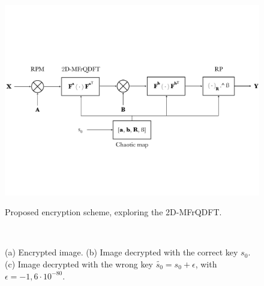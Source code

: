 \begin{figure}
\centering
\caption{Proposed encryption scheme, exploring the 2D-MFrQDFT.}
\includegraphics[width=0.9\linewidth]{Figures/esquema_EN.pdf}
\floatsource
\label{fig:cifragem}
\end{figure}

\begin{figure}
\centering
\caption{(a) Encrypted image. (b) Image decrypted with the correct key $ s_0 $. (c) Image decrypted with the wrong key $ \widetilde{s_0} = s_0 + \epsilon $, with $ \epsilon = -1{,}6 \cdot 10^{-80} $.}
~
~
~
\floatsource
\end{figure}


